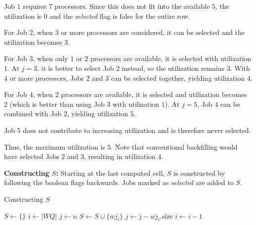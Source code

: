 \documentclass[12pt]{book}
\begin{document}
Job $1$ requires $7$ processors. Since this does not fit into the available $5$, the utilization is $0$ and the \emph{selected} flag is false for the entire row.  

For Job $2$, when $3$ or more processors are considered, it can be selected and the utilization becomes $3$.  

For Job $3$, when only $1$ or $2$ processors are available, it is selected with utilization $1$. At $j=3$, it is better to select Job $2$ instead, so the utilization remains $3$. With $4$ or more processors, Jobs $2$ and $3$ can be selected together, yielding utilization $4$.  

For Job $4$, when $2$ processors are available, it is selected and utilization becomes $2$ (which is better than using Job $3$ with utilization $1$). At $j=5$, Job $4$ can be combined with Job $2$, yielding utilization $5$.  

Job $5$ does not contribute to increasing utilization and is therefore never selected.  

Thus, the maximum utilization is $5$. Note that conventional backfilling would have selected Jobs $2$ and $3$, resulting in utilization $4$.  

\textbf{Constructing $S$:} Starting at the last computed cell, $S$ is constructed by following the boolean flags backwards. Jobs marked as \emph{selected} are added to $S$.  

\begin{algorithm}[H]
\caption{Constructing $S$}
\label{alg:conS}
\begin{algorithmic}[1]
\State $S \gets \{\}$ 
\State $i \gets |WQ|$ 
\State $j \gets n$
 
        \State $S \gets S \cup \{wj_i\}$ 
        \State $j \gets j - wj_i.\text{size}$ 
    \EndIf
    \State $i \gets i-1$
\EndWhile
\end{algorithmic}
\end{algorithm}
\end{document}
